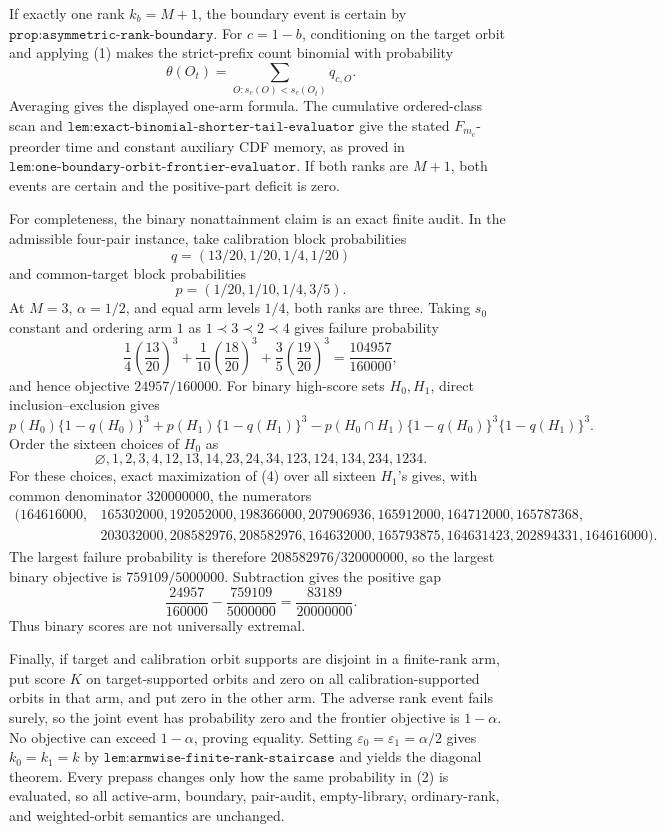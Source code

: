 If exactly one rank \(k_b=M+1\), the boundary event is certain by
\(\texttt{prop:asymmetric-rank-boundary}\). For \(c=1-b\), conditioning on the target orbit and applying (1) makes the strict-prefix count binomial with probability
\[
\theta(O_t)=\sum_{O:s_c(O)<s_c(O_t)}q_{c,O}.
\]
Averaging gives the displayed one-arm formula. The cumulative ordered-class scan and
\(\texttt{lem:exact-binomial-shorter-tail-evaluator}\) give the stated
\(F_{m_c}\)-preorder time and constant auxiliary CDF memory, as proved in
\(\texttt{lem:one-boundary-orbit-frontier-evaluator}\). If both ranks are \(M+1\), both events are certain and the positive-part deficit is zero.

For completeness, the binary nonattainment claim is an exact finite audit. In the admissible four-pair instance, take calibration block probabilities
\[
q=(13/20,1/20,1/4,1/20)
\]
and common-target block probabilities
\[
p=(1/20,1/10,1/4,3/5).
\]
At \(M=3\), \(\alpha=1/2\), and equal arm levels \(1/4\), both ranks are three. Taking \(s_0\) constant and ordering arm \(1\) as
\(1\prec3\prec2\prec4\) gives failure probability
\[
\frac14\left(\frac{13}{20}\right)^3+
\frac1{10}\left(\frac{18}{20}\right)^3+
\frac35\left(\frac{19}{20}\right)^3
=\frac{104957}{160000},
\]
and hence objective \(24957/160000\). For binary high-score sets \(H_0,H_1\), direct inclusion--exclusion gives
\[
p(H_0)\{1-q(H_0)\}^3+
p(H_1)\{1-q(H_1)\}^3-
p(H_0\cap H_1)\{1-q(H_0)\}^3\{1-q(H_1)\}^3.
\tag{4}
\]
Order the sixteen choices of \(H_0\) as
\[
\varnothing,1,2,3,4,12,13,14,23,24,34,123,124,134,234,1234.
\]
For these choices, exact maximization of (4) over all sixteen \(H_1\)'s gives, with common denominator \(320000000\), the numerators
\[
\begin{split}
(164616000,&165302000,192052000,198366000,207906936,165912000,164712000,165787368,\\
&203032000,208582976,208582976,164632000,165793875,164631423,202894331,164616000).
\end{split}
\]
The largest failure probability is therefore \(208582976/320000000\), so the largest binary objective is
\(759109/5000000\). Subtraction gives the positive gap
\[
\frac{24957}{160000}-\frac{759109}{5000000}
=\frac{83189}{20000000}.
\]
Thus binary scores are not universally extremal.

Finally, if target and calibration orbit supports are disjoint in a finite-rank arm, put score \(K\) on target-supported orbits and zero on all calibration-supported orbits in that arm, and put zero in the other arm. The adverse rank event fails surely, so the joint event has probability zero and the frontier objective is \(1-\alpha\). No objective can exceed \(1-\alpha\), proving equality. Setting
\(\varepsilon_0=\varepsilon_1=\alpha/2\) gives
\(k_0=k_1=k\) by
\(\texttt{lem:armwise-finite-rank-staircase}\) and yields the diagonal theorem. Every prepass changes only how the same probability in (2) is evaluated, so all active-arm, boundary, pair-audit, empty-library, ordinary-rank, and weighted-orbit semantics are unchanged.
